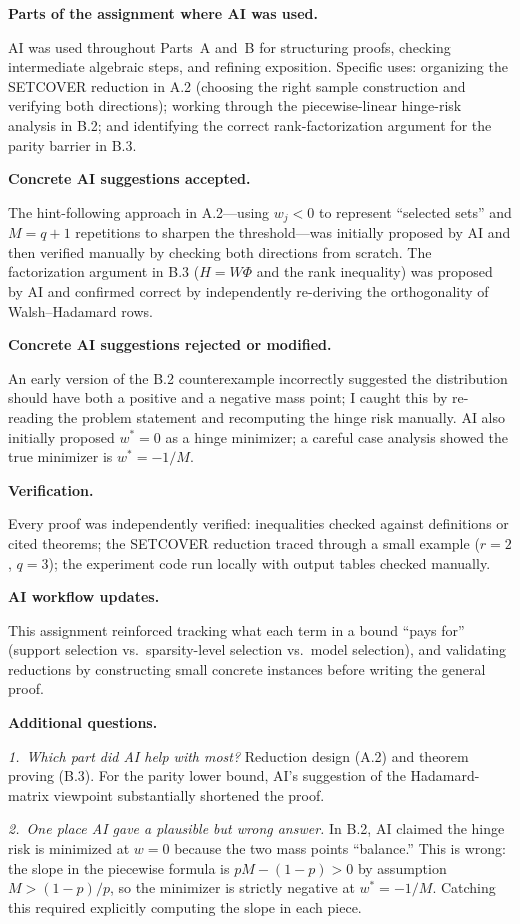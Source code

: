 \documentclass[11pt]{article}
\begin{document}
\begin{solutionbox}
    \textbf{Parts of the assignment where AI was used.}
    
    AI was used throughout Parts~A and~B for structuring proofs, checking intermediate
    algebraic steps, and refining exposition.  Specific uses: organizing the SETCOVER
    reduction in A.2 (choosing the right sample construction and verifying both directions);
    working through the piecewise-linear hinge-risk analysis in B.2; and identifying the
    correct rank-factorization argument for the parity barrier in B.3.
    
    \medskip
    \textbf{Concrete AI suggestions accepted.}
    
    The hint-following approach in A.2---using $w_j<0$ to represent ``selected sets'' and
    $M=q+1$ repetitions to sharpen the threshold---was initially proposed by AI and then
    verified manually by checking both directions from scratch.  The factorization argument in
    B.3 ($H=W\Phi$ and the rank inequality) was proposed by AI and confirmed correct by
    independently re-deriving the orthogonality of Walsh--Hadamard rows.
    
    \medskip
    \textbf{Concrete AI suggestions rejected or modified.}
    
    An early version of the B.2 counterexample incorrectly suggested the distribution should
    have both a positive and a negative mass point; I caught this by re-reading the problem
    statement and recomputing the hinge risk manually.  AI also initially proposed $w^*=0$ as
    a hinge minimizer; a careful case analysis showed the true minimizer is $w^*=-1/M$.
    
    \medskip
    \textbf{Verification.}
    
    Every proof was independently verified: inequalities checked against definitions or cited
    theorems; the SETCOVER reduction traced through a small example ($r=2$, $q=3$); the
    experiment code run locally with output tables checked manually.
    
    \medskip
    \textbf{AI workflow updates.}
    
    This assignment reinforced tracking what each term in a bound ``pays for'' (support
    selection vs.\ sparsity-level selection vs.\ model selection), and validating reductions
    by constructing small concrete instances before writing the general proof.
    
    \medskip
    \textbf{Additional questions.}
    
    \textit{1.\ Which part did AI help with most?}
    Reduction design (A.2) and theorem proving (B.3).  For the parity lower bound, AI's
    suggestion of the Hadamard-matrix viewpoint substantially shortened the proof.
    
    \textit{2.\ One place AI gave a plausible but wrong answer.}
    In B.2, AI claimed the hinge risk is minimized at $w=0$ because the two mass points
    ``balance.''  This is wrong: the slope in the piecewise formula is
    $pM-(1-p)>0$ by assumption $M>(1-p)/p$, so the minimizer is strictly negative at
    $w^*=-1/M$.  Catching this required explicitly computing the slope in each piece.
    
\end{solutionbox}
\end{document}
